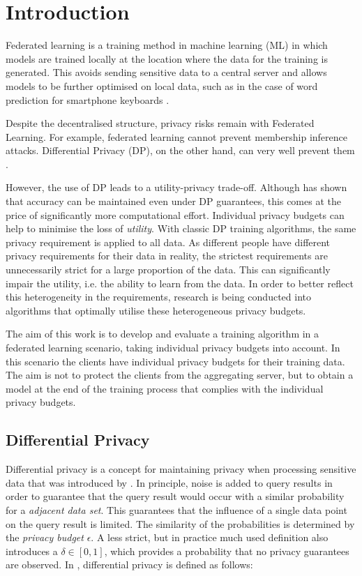 \chapter{Introduction}

Federated learning is a training method in machine learning (ML) in which models are trained locally at the location where the data for the training is generated. This avoids sending sensitive data to a central server and allows models to be further optimised on local data, such as in the case of word prediction for smartphone keyboards \parencite{mcmahan:2018}. 

Despite the decentralised structure, privacy risks remain with Federated Learning. For example, federated learning cannot prevent membership inference attacks. Differential Privacy (DP), on the other hand, can very well prevent them \parencite{shokri:2017}. 

However, the use of DP leads to a utility-privacy trade-off. Although \textcite{mcmahan:2018} has shown that accuracy can be maintained even under DP guarantees, this comes at the price of significantly more computational effort. Individual privacy budgets can help to minimise the loss of \textit{utility}. With classic DP training algorithms, the same privacy requirement is applied to all data. As different people have different privacy requirements for their data in reality, the strictest requirements are unnecessarily strict for a large proportion of the data. This can significantly impair the utility, i.e. the ability to learn from the data. In order to better reflect this heterogeneity in the requirements, research is being conducted into algorithms that optimally utilise these heterogeneous privacy budgets.

The aim of this work is to develop and evaluate a training algorithm in a federated learning scenario, taking individual privacy budgets into account. In this scenario the clients have individual privacy budgets for their training data. The aim is not to protect the clients from the aggregating server, but to obtain a model at the end of the training process that complies with the individual privacy budgets.

\section{Differential Privacy}

Differential privacy is a concept for maintaining privacy when processing sensitive data that was introduced by \textcite{dwork:2006}. In principle, noise is added to query results in order to guarantee that the query result would occur with a similar probability for a \textit{adjacent data set}. This guarantees that the influence of a single data point on the query result is limited. The similarity of the probabilities is determined by the \textit{privacy budget} $\epsilon$. A less strict, but in practice much used definition also introduces a $\delta \in [0,1]$, which provides a probability that no privacy guarantees are observed. In \textcite{abadi:2016}, differential privacy is defined as follows:

